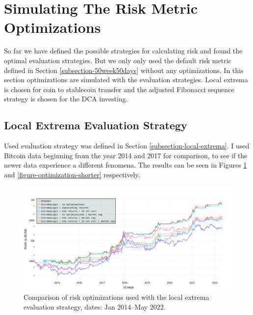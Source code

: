 \section{Simulating The Risk Metric Optimizations}
\label{section-sim-optimizations}
So far we have defined the possible strategies for calculating risk and found the optimal evaluation strategies. But we only only used the default risk metric defined in Section \ref{subsection-50week50days} without any optimizations. In this section optimizations are simulated with the evaluation strategies. Local extrema is chosen for coin to stablecoin transfer and the adjusted Fibonacci sequence strategy is chosen for the DCA investing.

\subsection*{Local Extrema Evaluation Strategy}
Used evaluation strategy was defined in Section \ref{subsection-local-extrema}. I used Bitcoin data beginning from the year 2014 and 2017 for comparison, to see if the newer data experience a different fenomena. The results can be seen in Figures \ref{figure-optimization-longer} and \ref{figure-optimization-shorter} respectively.

\begin{figure}[!hbt]
    \centering
    \includegraphics[width=\columnwidth]{figures/evaluation-optimization-longer.pdf}
    \caption{Comparison of risk optimizations used with the local extrema evaluation strategy, dates: Jan 2014--May 2022.}
    \label{figure-optimization-longer}
\end{figure}

